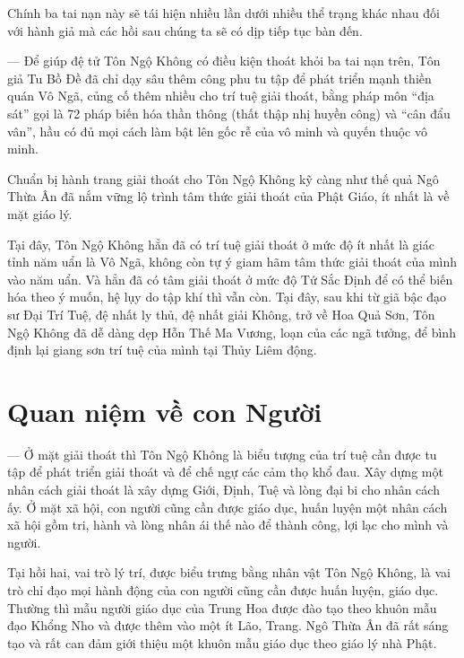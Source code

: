 Chính ba tai nạn này sẽ tái hiện nhiều lần dưới nhiều thể trạng khác nhau đối với hành giả mà các hồi sau chúng ta sẽ có dịp tiếp tục bàn đến.

--- Để giúp đệ tử Tôn Ngộ Không có điều kiện thoát khỏi ba tai nạn trên, Tôn giả Tu Bồ Đề đã chỉ dạy sâu thêm công phu tu tập để phát triển mạnh thiền quán Vô Ngã, củng cố thêm nhiều cho trí tuệ giải thoát, bằng pháp môn ``địa sát'' gọi là 72 pháp biến hóa thần thông (thất thập nhị huyền công) và ``cân đẩu vân'', hầu có đủ mọi cách làm bật lên gốc rễ của vô minh và quyến thuộc vô minh.

Chuẩn bị hành trang giải thoát cho Tôn Ngộ Không kỹ càng như thế quả Ngô Thừa Ân đã nắm vững lộ trình tâm thức giải thoát của Phật Giáo, ít nhất là về mặt giáo lý.

Tại đây, Tôn Ngộ Không hẳn đã có trí tuệ giải thoát ở mức độ ít nhất là giác tỉnh năm uẩn là Vô Ngã, không còn tự ý giam hãm tâm thức giải thoát của mình vào năm uẩn. Và hẳn đã có tâm giải thoát ở mức độ Tứ Sắc Định để có thể biến hóa theo ý muốn, hệ lụy do tập khí thì vẫn còn. Tại đây, sau khi từ giã bậc đạo sư Đại Trí Tuệ, đệ nhất ly thủ, đệ nhất giải Không, trở về Hoa Quả Sơn, Tôn Ngộ Không đã dễ dàng dẹp Hỗn Thế Ma Vương, loạn của các ngã tưởng, để bình định lại giang sơn trí tuệ của mình tại Thủy Liêm động.

\section{Quan niệm về con Người} %
\label{sec:2_quan_niem_ve_con_nguoi}

--- Ở mặt giải thoát thì Tôn Ngộ Không là biểu tượng của trí tuệ cần được tu tập để phát triển giải thoát và để chế ngự các cảm thọ khổ đau. Xây dựng một nhân cách giải thoát là xây dựng Giới, Định, Tuệ và lòng đại bi cho nhân cách ấy. Ở mặt xã hội, con người cũng cần được giáo dục, huấn luyện một nhân cách xã hội gồm tri, hành và lòng nhân ái thế nào để thành công, lợi lạc cho mình và người.

Tại hồi hai, vai trò lý trí, được biểu trưng bằng nhân vật Tôn Ngộ Không, là vai trò chỉ đạo mọi hành động của con người cũng cần được huấn luyện, giáo dục. Thường thì mẫu người giáo dục của Trung Hoa được đào tạo theo khuôn mẫu đạo Khổng Nho và được thêm vào một ít Lão, Trang. Ngô Thừa Ân đã rất sáng tạo và rất can đảm giới thiệu một khuôn mẫu giáo dục theo giáo lý nhà Phật.

